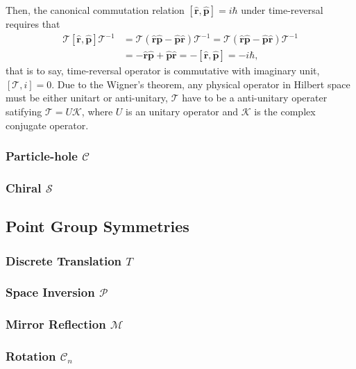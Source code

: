 Then, the canonical commutation relation $[\hat{\bm{r}},\hat{\bm{p}}]=i\hbar$ under time-reversal requires that
	\begin{equation}\begin{aligned}
	\mathcal{T}[\hat{\bm{r}},\hat{\bm{p}}]\mathcal{T}^{-1}
	&=\mathcal{T}(\hat{\bm{r}}\hat{\bm{p}}-\hat{\bm{p}}\hat{\bm{r}})\mathcal{T}^{-1}
	=\mathcal{T}(\hat{\bm{r}}\hat{\bm{p}}-\hat{\bm{p}}\hat{\bm{r}})\mathcal{T}^{-1}\\
	&=-\hat{\bm{r}}\hat{\bm{p}}+\hat{\bm{p}}\hat{\bm{r}}=-[\hat{\bm{r}},\hat{\bm{p}}]=-i\hbar,
	\end{aligned}\end{equation}
that is to say, time-reversal operator is commutative with imaginary unit, $[\mathcal{T},i]=0$. Due to the Wigner's theorem, any physical operator in Hilbert space must be either unitart or anti-unitary, $\mathcal{T}$ have to be a anti-unitary operater satifying $\mathcal{T}=U\mathcal{K}$, where $U$ is an unitary operator and $\mathcal{K}$ is the complex conjugate operator.


\subsubsection{Particle-hole $\mathcal{C}$}
\subsubsection{Chiral $\mathcal{S}$}

\subsection{Point Group Symmetries}
\subsubsection{Discrete Translation $T$}
\subsubsection{Space Inversion $\mathcal{P}$}
\subsubsection{Mirror Reflection $\mathcal{M}$}
\subsubsection{Rotation $\mathcal{C}_{n}$}


